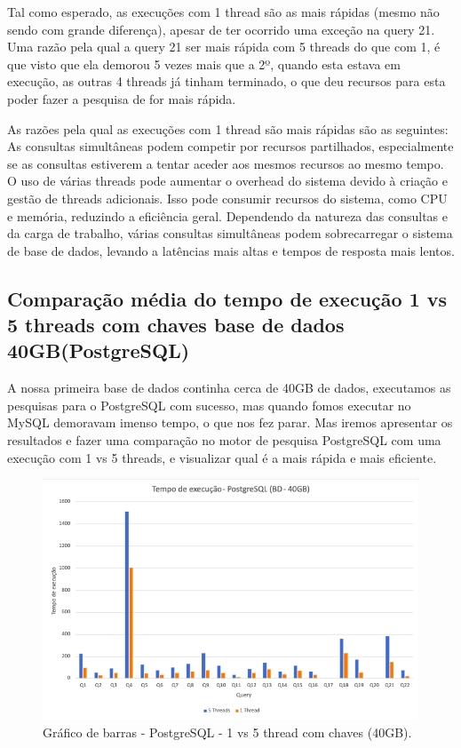 \documentclass{article}
\begin{document}
  Tal como esperado, as execuções com 1 thread são as mais rápidas (mesmo não sendo com grande diferença), apesar de ter ocorrido uma exceção na query 21. Uma razão pela qual a query 21 ser mais rápida com 5 threads do que com 1, é que visto que ela demorou 5 vezes mais que a 2º, quando esta estava em execução, as outras 4 threads já tinham terminado, o que deu recursos para esta poder fazer a pesquisa de for mais rápida.
  
  
  As razões pela qual as execuções com 1 thread são mais rápidas são as seguintes:\\
\quad As consultas simultâneas podem competir por recursos partilhados, especialmente se as consultas estiverem a tentar aceder aos mesmos recursos ao mesmo tempo.
O uso de várias threads pode aumentar o overhead do sistema devido à criação e gestão de threads adicionais. Isso pode consumir recursos do sistema, como CPU e memória, reduzindo a eficiência geral. 
Dependendo da natureza das consultas e da carga de trabalho, várias consultas simultâneas podem sobrecarregar o sistema de base de dados, levando a latências mais altas e tempos de resposta mais lentos. 
 
\clearpage

\subsection{Comparação média do tempo de execução 1 vs 5 threads com chaves base de dados 40GB(PostgreSQL)}

A nossa primeira base de dados continha cerca de 40GB de dados, executamos as pesquisas para o PostgreSQL com sucesso, mas quando fomos executar no MySQL demoravam imenso tempo, o que nos fez parar. Mas iremos apresentar os resultados e fazer uma comparação no motor de pesquisa PostgreSQL com uma execução com 1 vs 5 threads, e visualizar qual é a mais rápida e mais eficiente.

\begin{figure}[H]
  \centering
  \includegraphics[width=\textwidth]{Graphs/postgresql40gb.png}
  \caption{Gráfico de barras - PostgreSQL - 1 vs 5 thread com chaves (40GB).} 
  \label{fig:PKCreation2}
\end{figure}
\end{document}
